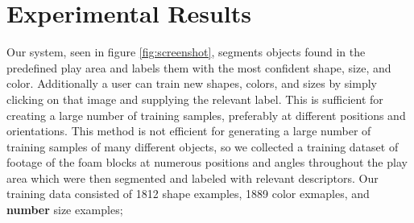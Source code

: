 \documentclass[11pt]{article}
\newcommand{\meh}[1]{{\bf \color{blue} #1}}
\begin{document}
\section{Experimental Results}

Our system, seen in figure \ref{fig:screenshot}, segments objects found in the
predefined play area and labels them with the most confident shape, size, and
color.  Additionally a user can train new shapes, colors, and sizes by simply
clicking on that image and supplying the relevant label.  This is sufficient
for creating a large number of training samples, preferably at different
positions and orientations.  This method is not efficient for generating a
large number of training samples of many different objects, so we collected a
training dataset of footage of the foam blocks at numerous positions and angles
throughout the play area which were then segmented and labeled with relevant
descriptors.  Our training data consisted of 1812 shape examples, 1889 color exmaples, and \meh{number} size examples;
\end{document}
